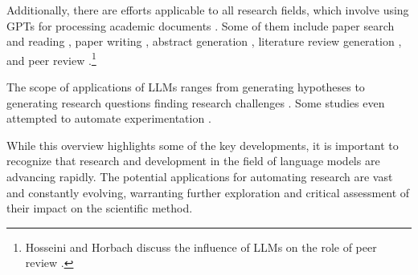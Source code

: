 Additionally, there are efforts applicable to all research fields, which involve using GPTs for processing academic documents \cite{alzaabi2023chatgpt}. Some of them include paper search and reading \cite{elicit,scispace}, paper writing \cite{transformer2022can}, abstract generation \cite{gao2023comparing}, literature review generation \cite{aydin2022openai}, and peer review \cite{wexin2023can,liu2023reviewergpt,robertson2023gpt4}.\footnote{
Hosseini and Horbach discuss the influence of LLMs on the role of peer review \cite{hosseini2023fighting}.
}

The scope of applications of LLMs ranges from generating hypotheses to generating research questions finding research challenges \cite{liu2023creative,oppenlaender2023mapping,lahat2023evaluating}. Some studies even attempted to automate experimentation \cite{boiko2023emergent,qin2023gpt}. 


While this overview highlights some of the key developments, it is important to recognize that research and development in the field of language models are advancing rapidly. The potential applications for automating research are vast and constantly evolving, warranting further exploration and critical assessment of their impact on the scientific method.





